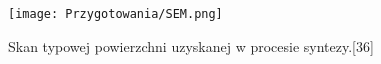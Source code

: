\begin{figure}[H]
	\begin{center}
		\texttt{[image: Przygotowania/SEM.png]}
		\caption{Skan typowej powierzchni uzyskanej w procesie syntezy.[36]}
	\end{center}
\end{figure}
























 